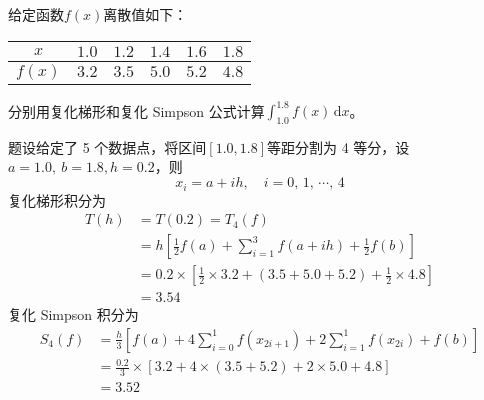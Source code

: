 \documentclass[11pt]{article}
\begin{document}
\maketitle

\thispagestyle{empty}

\newpage

\begin{question}

    \questiontext
    {
    给定函数$f(x)$离散值如下：
    \begin{table}[h]
        \centering
        \begin{tabular}{|c|c|c|c|c|c|}
            \hline
            $x$    & $1.0$ & $1.2$ & $1.4$ & $1.6$ & $1.8$ \\ \hline
            $f(x)$ & $3.2$ & $3.5$ & $5.0$ & $5.2$ & $4.8$ \\ \hline
        \end{tabular}
    \end{table}
    分别用复化梯形和复化 Simpson 公式计算$\displaystyle \int_{1.0}^{1.8}\!{f(x)\,\text{d}x}$。
    }
    \answer
    {
        题设给定了 5 个数据点，将区间$[1.0, 1.8]$等距分割为 4 等分，设$a = 1.0,\ b = 1.8, h = 0.2$，则
        $$
            x_i = a + ih,\quad i = 0,\, 1,\, \cdots,\, 4
        $$
        复化梯形积分为
        \begin{align*}
            T(h) & = T(0.2) = T_4(f)                                                                              \\
                 & = h \left[\frac{1}{2}f(a) + \sum_{i = 1}^{3}{f(a + ih)} + \frac{1}{2}f(b)\right]               \\
                 & = 0.2 \times \left[\frac{1}{2} \times 3.2 + (3.5 + 5.0 + 5.2) + \frac{1}{2} \times 4.8 \right] \\
                 & = 3.54
        \end{align*}
        复化 Simpson 积分为
        \begin{align*}
            S_4(f)
             & = \frac{h}{3} \left[f(a) + 4 \sum_{i = 0}^{1}{f(x_{2i + 1})} + 2\sum_{i = 1}^{1}{f(x_{2i})} + f(b)\right] \\
             & = \frac{0.2}{3} \times \left[3.2 + 4 \times (3.5 + 5.2) + 2 \times 5.0 + 4.8\right]                       \\
             & = 3.52
        \end{align*}
    }
\end{question}
\end{document}
